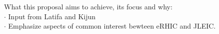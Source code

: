 What this proposal aims to achieve, its focus and why:\\
$\cdot$ Input from Latifa and Kijun\\
$\cdot$ Emphasize aspects of common interest bewteen eRHIC and JLEIC. \\
